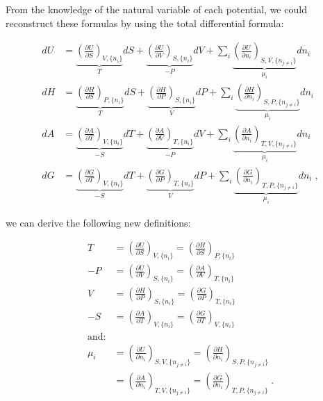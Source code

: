 \documentclass[
  9pt,
]{extbook}
\theoremstyle{definition}
\theoremstyle{definition}
\theoremstyle{definition}
\theoremstyle{remark}
\begin{document}
From the knowledge of the natural variable of each potential, we could reconstruct these formulas by using the total differential formula:

\begin{equation}
\begin{aligned}
dU &= \underbrace{\left(\frac{\partial U}{\partial S} \right)_{V,\{n_i\}}}_{T} dS + \underbrace{\left(\frac{\partial U}{\partial V} \right)_{S,\{n_i\}}}_{-P} dV + \sum_i \underbrace{\left(\frac{\partial U}{\partial n_i} \right)_{S,V,\{n_{j \neq i}\}}}_{\mu_i} dn_i \\
dH &= \underbrace{\left(\frac{\partial H}{\partial S} \right)_{P,\{n_i\}}}_{T} dS + \underbrace{\left(\frac{\partial H}{\partial P} \right)_{S,\{n_i\}}}_{V} dP + \sum_i \underbrace{\left(\frac{\partial H}{\partial n_i} \right)_{S,P,\{n_{j \neq i}\}}}_{\mu_i} dn_i \\
dA &= \underbrace{\left(\frac{\partial A}{\partial T} \right)_{V,\{n_i\}}}_{-S} dT + \underbrace{\left(\frac{\partial A}{\partial V} \right)_{T,\{n_i\}}}_{-P} dV + \sum_i \underbrace{\left(\frac{\partial A}{\partial n_i} \right)_{T,V,\{n_{j \neq i}\}}}_{\mu_i} dn_i \\
dG &= \underbrace{\left(\frac{\partial G}{\partial T} \right)_{V,\{n_i\}}}_{-S} dT + \underbrace{\left(\frac{\partial G}{\partial P} \right)_{T,\{n_i\}}}_{V} dP + \sum_i \underbrace{\left(\frac{\partial G}{\partial n_i} \right)_{T,P,\{n_{j \neq i}\}}}_{\mu_i} dn_i\;,
\end{aligned}
\label{eq:dhagchem2}
\end{equation}

we can derive the following new definitions:

\begin{equation}
\begin{aligned}
 T &= \left(\frac{\partial U}{\partial S} \right)_{V,\{n_i\}} = \left(\frac{\partial H}{\partial S} \right)_{P,\{n_i\}}  \\
-P &= \left(\frac{\partial U}{\partial V} \right)_{S,\{n_i\}} = \left(\frac{\partial A}{\partial V} \right)_{T,\{n_i\}}  \\
 V &= \left(\frac{\partial H}{\partial P} \right)_{S,\{n_i\}} = \left(\frac{\partial G}{\partial P} \right)_{T,\{n_i\}}  \\
-S &= \left(\frac{\partial A}{\partial T} \right)_{V,\{n_i\}} = \left(\frac{\partial G}{\partial T} \right)_{V,\{n_i\}}  \\
\text{and:}
\\
 \mu_i &=  \left(\frac{\partial U}{\partial n_i} \right)_{S,V,\{n_{j \neq i}\}} =  \left(\frac{\partial H}{\partial n_i} \right)_{S,P,\{n_{j \neq i}\}} \\
       &= \left(\frac{\partial A}{\partial n_i} \right)_{T,V,\{n_{j \neq i}\}} = \left(\frac{\partial G}{\partial n_i} \right)_{T,P,\{n_{j \neq i}\}}\;.
\end{aligned}
\label{eq:dhagchem3}
\end{equation}
\end{document}
